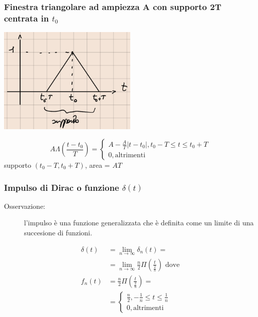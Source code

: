 \documentclass[a4paper, 12pt]{book}
\theoremstyle{plain}
\begin{document}
\subsubsection{Finestra triangolare ad ampiezza A con supporto 2T centrata in $t_0$}

\begin{center}
    \includegraphics[width=0.5\textwidth]{triangolo2.png}
\end{center}

\[
    A\Lambda(\frac{t - t_0}{T}) = \begin{cases}
        A - \frac{A}{T} |t - t_0|, t_0 - T \le t \le t_0 + T\\
        0, \textrm{altrimenti}
    \end{cases}
\]
supporto $(t_0 - T, t_0 + T)$, area = $AT$

\subsubsection{Impulso di Dirac o funzione $\delta (t)$}
\begin{description}
    \item[Osservazione: ] l'impulso è una funzione generalizzata che è definita come un limite di una succesione di funzioni. 
\end{description}

\[
    \begin{split}
        \delta(t) &= \lim_{n \rightarrow \infty} \delta_n (t) =\\
        &= \lim_{n \rightarrow \infty} \frac{n}{2}\Pi(\frac{t}{\frac{2}{n}}) \textrm{ dove}\\
        f_n(t) &= \frac{n}{2}\Pi(\frac{t}{\frac{2}{n}}) = \\
        &=\begin{cases}
            \frac{n}{2}, -\frac{1}{n} \le t \le \frac{1}{n}\\
            0, \textrm{altrimenti}
        \end{cases}
    \end{split}  
\]
\end{document}
